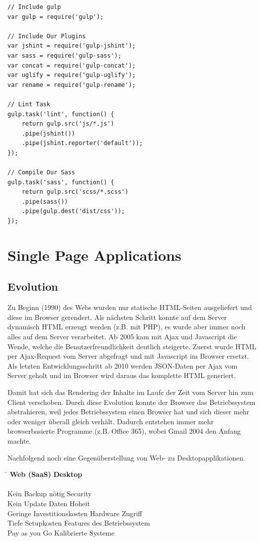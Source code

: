 \newpage

\begin{lstlisting}[label=lst:sample-gulp,caption=sample gulp]
// Include gulp
var gulp = require('gulp');

// Include Our Plugins
var jshint = require('gulp-jshint');
var sass = require('gulp-sass');
var concat = require('gulp-concat');
var uglify = require('gulp-uglify');
var rename = require('gulp-rename');

// Lint Task
gulp.task('lint', function() {
	return gulp.src('js/*.js')
	.pipe(jshint())
	.pipe(jshint.reporter('default'));
});

// Compile Our Sass
gulp.task('sass', function() {
	return gulp.src('scss/*.scss')
	.pipe(sass())
	.pipe(gulp.dest('dist/css'));
});
\end{lstlisting}

\section{Single Page Applications}

\subsection{Evolution}

Zu Beginn (1990) des Webs wurden nur statische HTML-Seiten ausgeliefert und diese im Browser gerendert. Als nächsten Schritt konnte auf dem Server dynamisch HTML erzeugt werden (z.B. mit PHP), es wurde aber immer noch alles auf dem Server verarbeitet. Ab 2005 kam mit Ajax und Javascript die Wende, welche die Benutzerfreundlichkeit deutlich steigerte. Zuerst wurde HTML per Ajax-Request vom Server abgefragt und mit Javascript im Browser ersetzt. Als letzten Entwicklungsschritt ab 2010 werden JSON-Daten per Ajax vom Server geholt und im Browser wird daraus das komplette HTML generiert. 

Damit hat sich das Rendering der Inhalte im Laufe der Zeit vom Server hin zum Client verschoben. Durch diese Evolution konnte der Browser das Betriebssystem abstrahieren, weil jedes Betriebssystem einen Browser hat und sich dieser mehr oder weniger überall gleich verhält. Dadurch entstehen immer mehr browserbasierte Programme (z.B. Office 365), wobei Gmail 2004 den Anfang machte.

Nachfolgend noch eine Gegenüberstellung von Web- zu Desktopapplikationen.

\begin{tabbing}
	\hspace{6cm}\=\kill
	\textbf{Web (SaaS)} \> \textbf{Desktop} \\
	\> \\
	Kein Backup nötig \> Security \\
	Kein Update \> Daten Hoheit \\
	Geringe Investitionskosten \> Hardware Zugriff \\
	Tiefe Setupkosten \> Features des Betriebssystem \\
	Pay as you Go \> Kalibrierte Systeme \\
\end{tabbing} 

